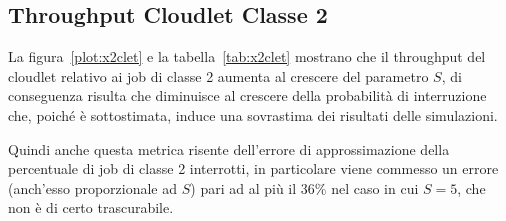\subsection{Throughput Cloudlet Classe 2}
La figura~\ref{plot:x2clet} e la tabella~\ref{tab:x2clet} mostrano che il
throughput del cloudlet relativo ai job di classe 2 aumenta al crescere del
parametro $S$, di conseguenza risulta che diminuisce al crescere della
probabilità di interruzione che, poiché è sottostimata, induce una sovrastima
dei risultati delle simulazioni.

Quindi anche questa metrica risente dell'errore di approssimazione della
percentuale di job di classe 2 interrotti, in particolare viene commesso un
errore (anch'esso proporzionale ad $S$) pari ad al più il $36\%$ nel caso in cui
$S=5$, che non è di certo trascurabile.

